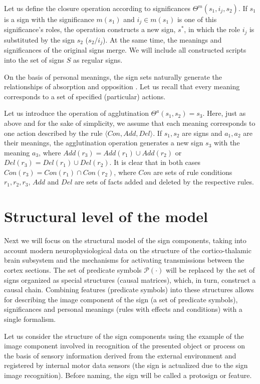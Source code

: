 \documentclass[review]{elsarticle}
\begin{document}
Let us define the closure operation according to significances $\Theta^m(s_1,i_j,s_2)$. If $s_1$ is a sign with the significance $m(s_1)$ and $i_j\in m(s_1)$ is one of this significance’s roles, the operation constructs a new sign, $s^*$, in which the role $i_j$ is substituted by the sign $s_2$ ($s_2/i_j$). At the same time, the meanings and significances of the original signs merge. We will include all constructed scripts into the set of signs $S$ as regular signs.

On the basis of personal meanings, the sign sets naturally generate the relationships of absorption and opposition \cite{Osipov2014c}. Let us recall that every meaning corresponds to a set of specified (particular) actions.

Let us introduce the operation of agglutination $\Theta^a(s_1,s_2)=s_3$. Here, just as above and for the sake of simplicity, we assume that each meaning corresponds to one action described by the rule $\langle Con, Add, Del \rangle$. If $s_1,s_2$ are signs and $a_1,a_2$ are their meanings, the agglutination operation generates a new sign $s_3$ with the meaning $a_3$, where $Add(r_3)=Add(r_1)\cup Add(r_2)$ or $Del(r_3)=Del(r_1)\cup Del(r_2)$. It is clear that in both cases $Con(r_3)=Con(r_1)\cap Con(r_2)$, where $Con$ are sets of rule conditions $r_1,r_2,r_3$, $Add$ and $Del$ are sets of facts added and deleted by the respective rules.

\section{Structural level of the model}\label{sec:structure}

Next we will focus on the structural model of the sign components, taking into account modern neurophysiological data on the structure of the cortico-thalamic brain subsystem and the mechanisms for activating transmissions between the cortex sections. The set of predicate symbols $\mathcal P(\cdot)$ will be replaced by the set of signs organized as special structures (causal matrices), which, in turn, construct a causal chain. Combining features (predicate symbols) into these structures allows for describing the image component of the sign (a set of predicate symbols), significances and personal meanings (rules with effects and conditions) with a single formalism.

Let us consider the structure of the sign components using the example of the image component involved in recognition of the presented object or process on the basis of sensory information derived from the external environment and registered by internal motor data sensors (the sign is actualized due to the sign image recognition). Before naming, the sign will be called a protosign or feature.
\end{document}
